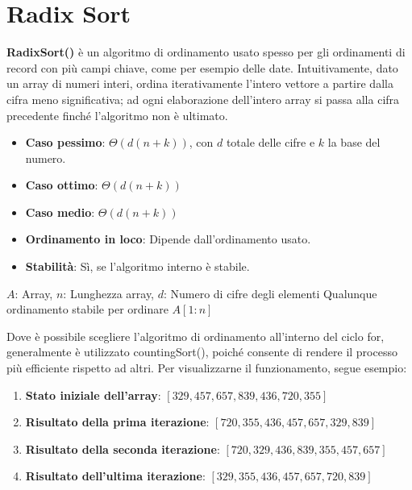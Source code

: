 \section{Radix Sort}
\textbf{RadixSort()} è un algoritmo di ordinamento usato spesso per gli ordinamenti di record con più campi chiave, come per esempio delle date. Intuitivamente, dato un array di numeri interi, ordina iterativamente l'intero vettore a partire dalla cifra meno significativa; ad ogni elaborazione dell'intero array si passa alla cifra precedente finché l'algoritmo non è ultimato. \begin{itemize}
	\item \textbf{Caso pessimo}: $\Theta(d(n+k))$, con $d$ totale delle cifre e $k$ la base del numero.
	\item \textbf{Caso ottimo}: $\Theta(d(n+k))$
	\item \textbf{Caso medio}: $\Theta(d(n+k))$
	\item \textbf{Ordinamento in loco}: Dipende dall'ordinamento usato.
	\item \textbf{Stabilità}: Sì, se l'algoritmo interno è stabile.
\end{itemize}
\begin{algorithm}[h]
	\caption{radixSort(A, n, d)}
	\begin{algorithmic}[i]
		\Require $A$: Array, $n$: Lunghezza array, $d$: Numero di cifre degli elementi
		\State Qualunque ordinamento stabile per ordinare $A[1:n]$
		\EndFor
	\end{algorithmic}
\end{algorithm}
\noindent Dove è possibile scegliere l'algoritmo di ordinamento all'interno del ciclo for, generalmente è utilizzato countingSort(), poiché consente di rendere il processo più efficiente rispetto ad altri. Per visualizzarne il funzionamento, segue esempio: \begin{enumerate}
	\item \textbf{Stato iniziale dell'array}: $[329, 457, 657, 839, 436, 720, 355]$
	\item \textbf{Risultato della prima iterazione}: $[720, 355, 436, 457, 657, 329, 839]$
	\item \textbf{Risultato della seconda iterazione}: $[720, 329, 436, 839, 355, 457, 657]$
	\item \textbf{Risultato dell'ultima iterazione}: $[329, 355, 436, 457, 657, 720, 839]$
\end{enumerate}

%

